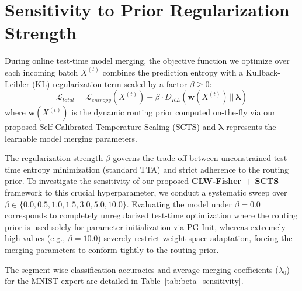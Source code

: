 \documentclass{article}
\theoremstyle{plain}
\theoremstyle{definition}
\theoremstyle{remark}
\begin{document}
\section{Sensitivity to Prior Regularization Strength}
\label{sec:appendix_beta}

During online test-time model merging, the objective function we optimize over each incoming batch $X^{(t)}$ combines the prediction entropy with a Kullback-Leibler (KL) regularization term scaled by a factor $\beta \ge 0$:
\begin{equation}
  \mathcal{L}_{total} = \mathcal{L}_{entropy}(X^{(t)}) + \beta \cdot D_{KL}\left(\mathbf{w}(X^{(t)}) \,||\, \boldsymbol{\lambda}\right)
\end{equation}
where $\mathbf{w}(X^{(t)})$ is the dynamic routing prior computed on-the-fly via our proposed Self-Calibrated Temperature Scaling (SCTS) and $\boldsymbol{\lambda}$ represents the learnable model merging parameters.

The regularization strength $\beta$ governs the trade-off between unconstrained test-time entropy minimization (standard TTA) and strict adherence to the routing prior. To investigate the sensitivity of our proposed \textbf{CLW-Fisher + SCTS} framework to this crucial hyperparameter, we conduct a systematic sweep over $\beta \in \{0.0, 0.5, 1.0, 1.5, 3.0, 5.0, 10.0\}$. Evaluating the model under $\beta=0.0$ corresponds to completely unregularized test-time optimization where the routing prior is used solely for parameter initialization via PG-Init, whereas extremely high values (e.g., $\beta=10.0$) severely restrict weight-space adaptation, forcing the merging parameters to conform tightly to the routing prior.

The segment-wise classification accuracies and average merging coefficients ($\lambda_0$) for the MNIST expert are detailed in Table~\ref{tab:beta_sensitivity}.
\end{document}
